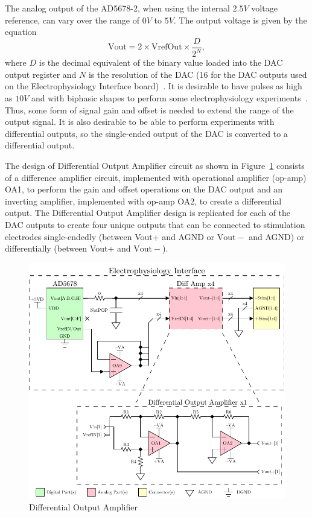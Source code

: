 The analog output of the AD5678-2, when using the internal $2.5\unit{V}$ voltage reference, can vary over the range of $0\unit{V}$ to $5\unit{V}$.  The output voltage is given by the equation
\begin{equation}
\label{equ:DACout}
\mathrm{Vout} = 2 \times \mathrm{VrefOut}  \times \frac{D}{2^N},
\end{equation}
where $D$ is the decimal equivalent of the binary value loaded into the DAC output register and $N$ is the resolution of the DAC (16 for the DAC outputs used on the Electrophysiology Interface board)~\cite{AD5678ds}.  It is desirable to have pulses as high as $10\unit{V}$ and with biphasic shapes to perform some electrophysiology experiments~\cite{Olivo,Kladt2010}.  Thus, some form of signal gain and offset is needed to extend the range of the output signal.  It is also desirable to be able to perform experiments with differential outputs, so the single-ended output of the DAC is converted to a differential output.

The design of Differential Output Amplifier circuit as shown in Figure~\ref{fig:DiffAmp} consists of a difference amplifier circuit, implemented with operational amplifier (op-amp) OA1, to perform the gain and offset operations on the DAC output and an inverting amplifier, implemented with op-amp OA2, to create a differential output.  The Differential Output Amplifier design is replicated for each of the DAC outputs to create four unique outputs that can be connected to stimulation electrodes single-endedly (between Vout+ and AGND or $\mathrm{Vout-}$ and AGND) or differentially (between Vout+ and $\mathrm{Vout-}$).

\begin{figure}[H]
	\centering 
		\includegraphics{./figures/DiffAmp} 
	\caption{Differential Output Amplifier\label{fig:DiffAmp}}
\end{figure}

